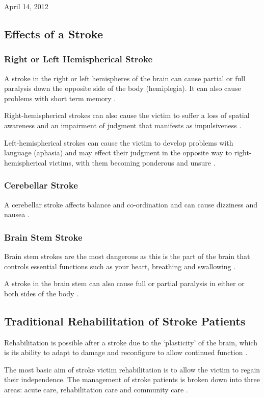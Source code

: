 \documentclass[journal]{IEEEtran}
\begin{document}
\hfill April 14, 2012

\subsection{Effects of a Stroke}
\subsubsection{Right or Left Hemispherical Stroke}
A stroke in the right or left hemispheres of the brain can cause partial 
or full paralysis down the opposite side of the body (hemiplegia). It can 
also cause problems with short term memory \cite{NSA}.

Right-hemispherical strokes can also cause the victim to suffer a loss 
of spatial awareness and an impairment of judgment that manifests as 
impulsiveness \cite{NSA}.

Left-hemispherical strokes can cause the victim to develop problems with 
language (aphasia) and may effect their judgment in the opposite way to 
right-hemispherical victims, with them becoming ponderous and unsure \cite{NSA}.

\subsubsection{Cerebellar Stroke}
A cerebellar stroke affects balance and co-ordination and can cause dizziness 
and nausea \cite{NSA, TheBrain}.

\subsubsection{Brain Stem Stroke}
Brain stem strokes are the most dangerous as this is the part of the brain that 
controls essential functions such as your heart, breathing and swallowing \cite{NSA,TheBrain}.

A stroke in the brain stem can also cause full or partial paralysis in either or 
both sides of the body \cite{NSA}.

\subsection{Traditional Rehabilitation of Stroke Patients}
Rehabilitation is possible after a stroke due to the `plasticity' of the brain, which is 
its ability to adapt to damage and reconfigure to allow continued function \cite{TheBrain}.

The most basic aim of stroke victim rehabilitation is to allow the victim to regain 
their independence. The management of stroke patients is broken down into three 
areas: acute care, rehabilitation care and community care \cite{Physio}.
\end{document}
